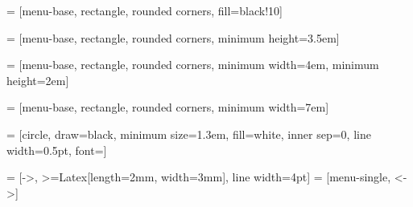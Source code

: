  = [menu-base, rectangle, rounded corners, fill=black!10]

 = [menu-base, rectangle, rounded corners, minimum height=3.5em]

 = [menu-base, rectangle, rounded corners, minimum
width=4em, minimum height=2em]

 = [menu-base, rectangle, rounded corners, minimum
width=7em]

 = [circle, draw=black, minimum size=1.3em, fill=white, inner
sep=0, line width=0.5pt, font=\footnotesize]

 = [->, >={Latex[length=2mm, width=3mm]}, line width=4pt]
 = [menu-single, <->]

\newcommand{\LRvert}[2]{%
    \draw[menu-single] ([xshift=1em]#1.south) -- node[button-label] {R}
        ([xshift=1em]#2.north);
    \draw[menu-single] ([xshift=-1em]#2.north) -- node[button-label] {L}
        ([xshift=-1em]#1.south);
}

\newcommand{\LRhor}[2]{%
    \draw[menu-single] ([yshift=0.5em]#1.east) -- node[button-label] {R}
        ([yshift=0.5em]#2.west);
    \draw[menu-single] ([yshift=-0.5em]#2.west) -- node[button-label] {L}
        ([yshift=-0.5em]#1.east);
}

\newcommand{\IncrementDecrementNode}[2]{%
    \node (_#2anchor) [#1=\shortarrowlength+1.3em of #2, outer sep=1pt, inner sep=0] {};
    \node (_#2L) [button-label, above left=0.2em of _#2anchor] {L};
    \node (_#2dec) [below left=0.2em of _#2anchor, inner sep=0, circle, minimum size=1.3em] {--};
    \node (_#2R) [button-label, above right=0.2em of _#2anchor] {R};
    \node (_#2inc) [below right=0.2em of _#2anchor, inner sep=0, circle, minimum size=1.3em] {+};
    \node (_#2set) [fit={(_#2L) (_#2R) (_#2dec) (_#2inc)}, draw] {};
}

\newcommand{\SetTimeNode}[3]{%
    \node (#1) [#2, menu-small-item] {#3};
    \IncrementDecrementNode{below}{#1}
    \draw[menu-double] (#1) -- node[button-label] {SP} (_#1set.north);
}

